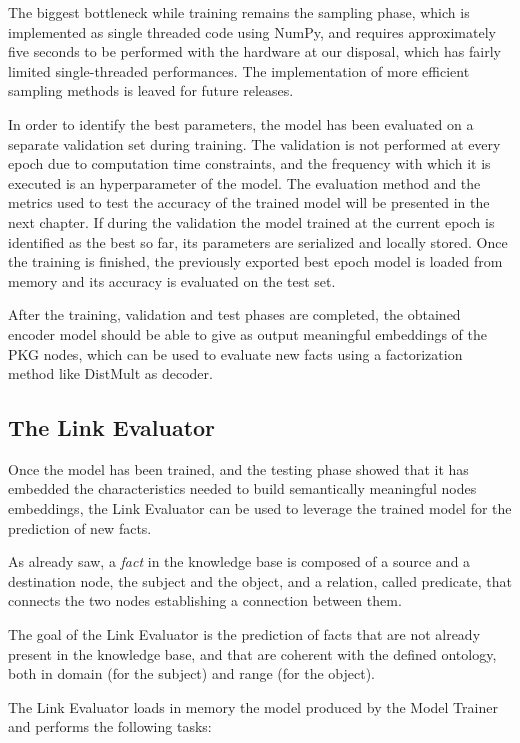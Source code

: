 \documentclass[%
    corpo=13.5pt,
    twoside,
    oldstyle,
    tipotesi=magistrale,
    greek,
    evenboxes
]{toptesi}
\begin{document}
The biggest bottleneck while training remains the sampling phase, which is
implemented as single threaded code using NumPy\cite{oliphant2006}, and
requires approximately five seconds to be performed with the hardware at our
disposal, which has fairly limited single-threaded performances.
The implementation of more efficient sampling methods is leaved for future
releases.

In order to identify the best parameters, the model has been evaluated
on a separate validation set during training.
The validation is not performed at every epoch due to computation time
constraints, and the frequency with which it is executed is an hyperparameter
of the model.
The evaluation method and the metrics used to test the accuracy of the
trained model will be presented in the next chapter.
If during the validation the model trained at the current epoch is identified
as the best so far, its parameters are serialized and locally stored.
Once the training is finished, the previously exported best epoch model is
loaded from memory and its accuracy is evaluated on the test set.

After the training, validation and test phases are completed, the obtained
encoder model should be able to give as output meaningful embeddings of the
PKG nodes, which can be used to evaluate new facts using a factorization method
like DistMult as decoder.


\subsection{The Link Evaluator}

Once the model has been trained, and the testing phase showed
that it has embedded the characteristics needed to build
semantically meaningful nodes embeddings, the Link Evaluator can be
used to leverage the trained model for the prediction of new facts.

As already saw, a \emph{fact} in the knowledge base is composed of a source
and a destination node, the subject and the object, and a relation, called
predicate, that connects the two nodes establishing a connection between them.

The goal of the Link Evaluator is the prediction of facts that are not already
present in the knowledge base, and that are coherent with the defined ontology,
both in domain (for the subject) and range (for the object).

The Link Evaluator loads in memory the model produced by the Model Trainer and
performs the following tasks:
\end{document}
